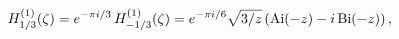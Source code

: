 \[\mathop{{H^{(1)}_{1/3}}\/}\nolimits\!\left(\zeta\right)=e^{-\pi i/3}\mathop{{H%
^{(1)}_{-1/3}}\/}\nolimits\!\left(\zeta\right)=e^{-\pi i/6}\sqrt{3/z}\left(%
\mathop{\mathrm{Ai}\/}\nolimits\!\left(-z\right)-i\mathop{\mathrm{Bi}\/}%
\nolimits\!\left(-z\right)\right),\]